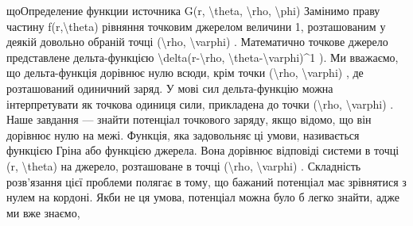 \documentclass[
  ukrainian,
]{article}
\begin{document}
{{що}{Определение функции источника G(r, \textbackslash theta, \textbackslash rho, \textbackslash phi) Замінимо праву частину f(r,\textbackslash theta) рівняння точковим джерелом величини 1, розташованим у деякій довольно обраній точці (\textbackslash rho, \textbackslash varphi) . Математично точкове джерело представлене дельта-функцією \textbackslash delta(r-\textbackslash rho, \textbackslash theta-\textbackslash varphi)\^{}1 ). Ми вважаємо, що дельта-функція дорівнює нулю всюди, крім точки (\textbackslash rho, \textbackslash varphi) , де розташований одиничний заряд. У мові сил дельта-функцію можна інтерпретувати як точкова одиниця сили, прикладена до точки (\textbackslash rho, \textbackslash varphi) . Наше завдання --- знайти потенціал точкового заряду, якщо відомо, що він дорівнює нулю на межі. Функція, яка задовольняє ці умови, називається функцією Гріна або функцією джерела. Вона дорівнює відповіді системи в точці (r, \textbackslash theta) на джерело, розташоване в точці (\textbackslash rho, \textbackslash varphi) . Складність розв'язання цієї проблеми полягає в тому, що бажаний потенціал має зрівнятися з нулем на кордоні. Якби не ця умова, потенціал можна було б легко знайти, адже ми вже знаємо, }}
\end{document}
